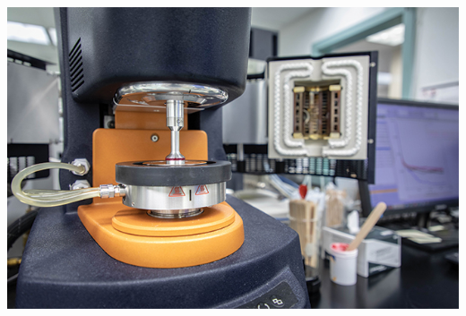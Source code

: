 \documentclass[xcolor=table]{beamer}
\begin{document}
\begin{frame}
\begin{columns}
\begin{column}{.6\textwidth}
\includegraphics[width=0.7\columnwidth]{rheometer_full_width.jpg}\\
\end{column}
\end{columns}
\end{frame}
\end{document}
